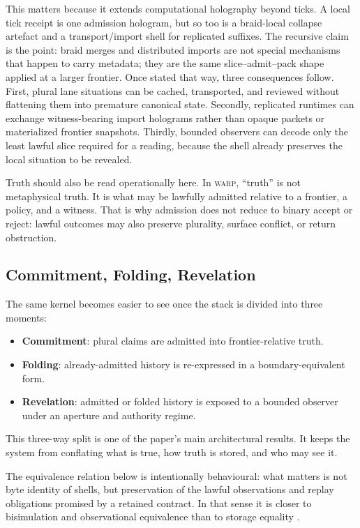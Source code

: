\documentclass[11pt]{article}
\theoremstyle{definition}
\theoremstyle{plain}
\theoremstyle{remark}
\newcommand{\WARP}{\textsc{warp}}
\begin{document}
This matters because it extends computational holography beyond ticks. A local
tick receipt is one admission hologram, but so too is a braid-local collapse
artefact and a transport/import shell for replicated suffixes. The recursive
claim is the point: braid merges and distributed imports are not special
mechanisms that happen to carry metadata; they are the same slice--admit--pack
shape applied at a larger frontier. Once stated that way, three consequences follow. First, plural lane situations can be cached,
transported, and reviewed without flattening them into premature canonical
state. Secondly, replicated runtimes can exchange witness-bearing import
holograms rather than opaque packets or materialized frontier snapshots. Thirdly, bounded
observers can decode only the least lawful slice required for a reading,
because the shell already preserves the local situation to be revealed.

Truth should also be read operationally here. In \WARP{}, ``truth'' is not metaphysical truth. It is what may be lawfully admitted relative to a frontier, a policy, and a witness. That is why admission does not reduce to binary accept or reject: lawful outcomes may also preserve plurality, surface conflict, or return obstruction.

\subsection{Commitment, Folding, Revelation}

The same kernel becomes easier to see once the stack is divided into three moments:

\begin{itemize}[leftmargin=*]
  \item \textbf{Commitment}: plural claims are admitted into frontier-relative truth.
  \item \textbf{Folding}: already-admitted history is re-expressed in a boundary-equivalent form.
  \item \textbf{Revelation}: admitted or folded history is exposed to a bounded observer under an aperture and authority regime.
\end{itemize}

This three-way split is one of the paper's main architectural results. It keeps the system from conflating what is true, how truth is stored, and who may see it.

The equivalence relation below is intentionally behavioural: what matters is not byte identity of shells, but preservation of the lawful observations and replay obligations promised by a retained contract. In that sense it is closer to bisimulation and observational equivalence than to storage equality \cite{park1981concurrency,milner1989communication}.
\end{document}
